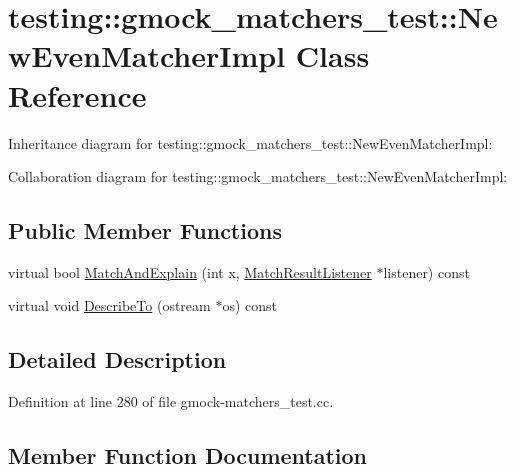 \hypertarget{classtesting_1_1gmock__matchers__test_1_1_new_even_matcher_impl}{}\section{testing\+:\+:gmock\+\_\+matchers\+\_\+test\+:\+:New\+Even\+Matcher\+Impl Class Reference}
\label{classtesting_1_1gmock__matchers__test_1_1_new_even_matcher_impl}


Inheritance diagram for testing\+:\+:gmock\+\_\+matchers\+\_\+test\+:\+:New\+Even\+Matcher\+Impl\+:


Collaboration diagram for testing\+:\+:gmock\+\_\+matchers\+\_\+test\+:\+:New\+Even\+Matcher\+Impl\+:
\subsection*{Public Member Functions}
\begin{DoxyCompactItemize}
\item 
virtual bool \hyperlink{classtesting_1_1gmock__matchers__test_1_1_new_even_matcher_impl_ae09c1c6d46be8b229f271571cd4df53f}{Match\+And\+Explain} (int x, \hyperlink{classtesting_1_1_match_result_listener}{Match\+Result\+Listener} $\ast$listener) const 
\item 
virtual void \hyperlink{classtesting_1_1gmock__matchers__test_1_1_new_even_matcher_impl_a28f634d1b39d1d7a9008b29068e98ce2}{Describe\+To} (ostream $\ast$os) const 
\end{DoxyCompactItemize}


\subsection{Detailed Description}


Definition at line 280 of file gmock-\/matchers\+\_\+test.\+cc.



\subsection{Member Function Documentation}
